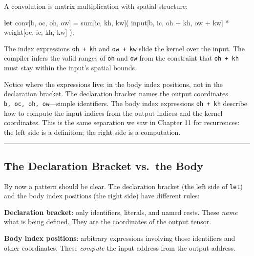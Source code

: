 \documentclass[11pt,]{article}
\newenvironment{Shaded}{}{}
\newcommand{\KeywordTok}[1]{\textcolor[rgb]{0.00,0.44,0.13}{\textbf{#1}}}
\newcommand{\NormalTok}[1]{#1}
\newcommand{\OperatorTok}[1]{\textcolor[rgb]{0.40,0.40,0.40}{#1}}
\begin{document}
A convolution is matrix multiplication with spatial structure:

\begin{Shaded}
\begin{Highlighting}[]
\KeywordTok{let}\NormalTok{ conv}\OperatorTok{[}\NormalTok{b, oc, oh, ow}\OperatorTok{]}\NormalTok{ = sum}\OperatorTok{[}\NormalTok{ic, kh, kw}\OperatorTok{]}\NormalTok{(}
\NormalTok{    input}\OperatorTok{[}\NormalTok{b, ic, oh + kh, ow + kw}\OperatorTok{]}\NormalTok{ * weight}\OperatorTok{[}\NormalTok{oc, ic, kh, kw}\OperatorTok{]}
\NormalTok{);}
\end{Highlighting}
\end{Shaded}

The index expressions \texttt{oh\ +\ kh} and \texttt{ow\ +\ kw} slide
the kernel over the input. The compiler infers the valid ranges of
\texttt{oh} and \texttt{ow} from the constraint that \texttt{oh\ +\ kh}
must stay within the input's spatial bounds.

Notice where the expressions live: in the body index positions, not in
the declaration bracket. The declaration bracket names the output
coordinates \texttt{b,\ oc,\ oh,\ ow}---simple identifiers. The body
index expressions \texttt{oh\ +\ kh} describe how to compute the input
indices from the output indices and the kernel coordinates. This is the
same separation we saw in Chapter 11 for recurrences: the left side is a
definition; the right side is a computation.

\begin{center}\rule{0.5\linewidth}{0.4pt}\end{center}

\hypertarget{the-declaration-bracket-vs.the-body}{%
\subsection{The Declaration Bracket vs.~the
Body}\label{the-declaration-bracket-vs.the-body}}

By now a pattern should be clear. The declaration bracket (the left side
of \texttt{let}) and the body index positions (the right side) have
different rules:

\textbf{Declaration bracket}: only identifiers, literals, and named
rests. These \emph{name} what is being defined. They are the coordinates
of the output tensor.

\textbf{Body index positions}: arbitrary expressions involving those
identifiers and other coordinates. These \emph{compute} the input
address from the output address.
\end{document}
